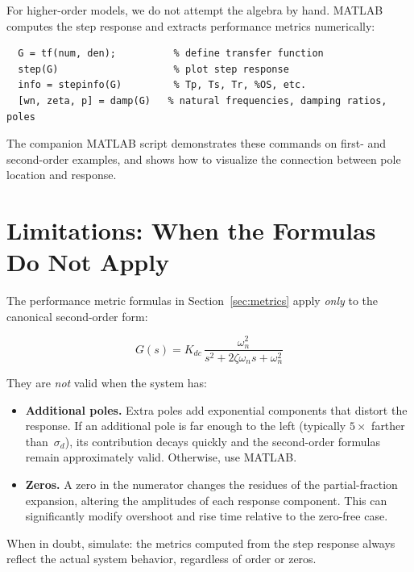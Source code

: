 \documentclass[../../book.tex]{subfiles}
\begin{document}
For higher-order models, we do not attempt the algebra by hand.  MATLAB
computes the step response and extracts performance metrics numerically:

\begin{verbatim}
  G = tf(num, den);          % define transfer function
  step(G)                    % plot step response
  info = stepinfo(G)         % Tp, Ts, Tr, %OS, etc.
  [wn, zeta, p] = damp(G)   % natural frequencies, damping ratios, poles
\end{verbatim}

The companion MATLAB script demonstrates these commands on first- and
second-order examples, and shows how to visualize the connection between
pole location and response.

\section{Limitations: When the Formulas Do Not Apply}
\label{sec:limits}

The performance metric formulas in Section~\ref{sec:metrics} apply
\emph{only} to the canonical second-order form:

\[
  G(s) = K_{dc}\,\frac{\omega_n^2}{s^2 + 2\zeta\omega_n s + \omega_n^2}
\]

They are \emph{not} valid when the system has:
\begin{itemize}
  \item \textbf{Additional poles.}  Extra poles add exponential components
    that distort the response.  If an additional pole is far enough to the
    left (typically $5\times$ farther than~$\sigma_d$), its contribution decays
    quickly and the second-order formulas remain approximately valid.  Otherwise,
    use MATLAB.
  \item \textbf{Zeros.}  A zero in the numerator changes the residues of the
    partial-fraction expansion, altering the amplitudes of each response
    component.  This can significantly modify overshoot and rise time relative
    to the zero-free case.
\end{itemize}

When in doubt, simulate: the metrics computed from the step response always
reflect the actual system behavior, regardless of order or zeros.
\end{document}
